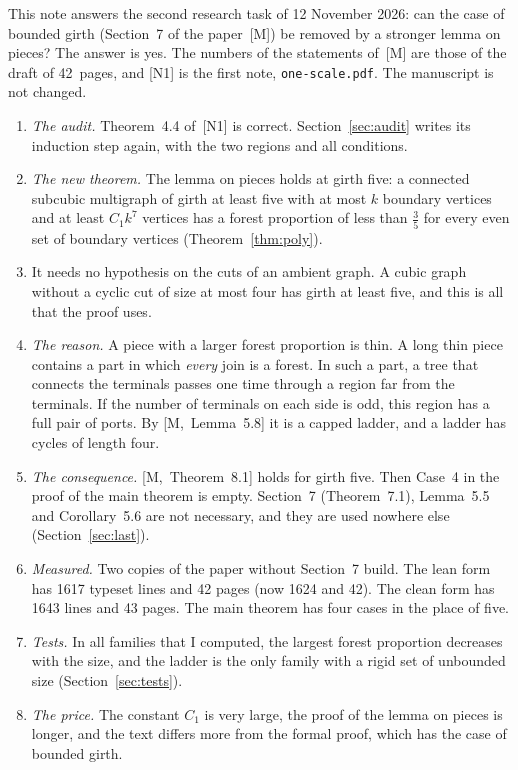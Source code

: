 \documentclass[11pt]{article}
\newcommand{\M}[1]{[M,~#1]}
\begin{document}
\maketitleblock

This note answers the second research task of 12 November 2026: can the case of bounded girth
(Section~7 of the paper~[M]) be removed by a stronger lemma on pieces? The answer is yes. The
numbers of the statements of~[M] are those of the draft of 42~pages, and [N1] is the first note,
\texttt{one-scale.pdf}. The manuscript is not changed.

\begin{enumerate}[leftmargin=1.6em]
\item \emph{The audit.} Theorem~4.4 of~[N1] is correct. Section~\ref{sec:audit} writes its
induction step again, with the two regions and all conditions.
\item \emph{The new theorem.} The lemma on pieces holds at girth five: a connected subcubic
multigraph of girth at least five with at most $k$ boundary vertices and at least $C_1k^{7}$
vertices has a forest proportion of less than $\frac35$ for every even set of boundary vertices
(Theorem~\ref{thm:poly}).
\item It needs no hypothesis on the cuts of an ambient graph. A cubic graph without a cyclic cut
of size at most four has girth at least five, and this is all that the proof uses.
\item \emph{The reason.} A piece with a larger forest proportion is thin. A long thin piece
contains a part in which \emph{every} join is a forest. In such a part, a tree that connects the
terminals passes one time through a region far from the terminals. If the number of terminals on
each side is odd, this region has a full pair of ports. By \M{Lemma~5.8} it is a capped ladder,
and a ladder has cycles of length four.
\item \emph{The consequence.} \M{Theorem~8.1} holds for girth five. Then Case~4 in the proof of
the main theorem is empty. Section~7 (Theorem~7.1), Lemma~5.5 and Corollary~5.6 are not
necessary, and they are used nowhere else (Section~\ref{sec:last}).
\item \emph{Measured.} Two copies of the paper without Section~7 build. The lean form has 1617
typeset lines and 42 pages (now 1624 and 42). The clean form has 1643 lines and 43 pages. The
main theorem has four cases in the place of five.
\item \emph{Tests.} In all families that I computed, the largest forest proportion decreases
with the size, and the ladder is the only family with a rigid set of unbounded size
(Section~\ref{sec:tests}).
\item \emph{The price.} The constant $C_1$ is very large, the proof of the lemma on pieces is
longer, and the text differs more from the formal proof, which has the case of bounded girth.
\end{enumerate}
\end{document}
